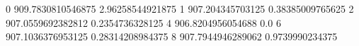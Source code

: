 0 909.7830810546875 2.96258544921875
1 907.204345703125 0.38385009765625
2 907.0559692382812 0.2354736328125
4 906.8204956054688 0.0
6 907.1036376953125 0.28314208984375
8 907.7944946289062 0.9739990234375
